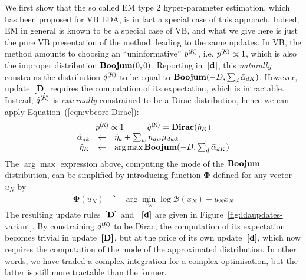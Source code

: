 We first show that the so called EM type 2 hyper-parameter estimation, which has been proposed for VB LDA, is in fact a special case of this approach. Indeed, EM in general is known to be a special case of VB, and what we give here is just the pure VB presentation of the method, leading to the same updates. In VB, the method amounts to choosing an ``uninformative'' ${p}^{(\!{K}\!)}$, i.e. ${p}^{(\!{K}\!)}\propto1$, which is also the improper distribution $\mathbf{Boojum}(0,0)$. Reporting in~$\textbf{[d]}$, this {\em naturally} constrains the distribution ${\dot{q}}^{(\!{K}\!)}$ to be equal to $\mathbf{Boojum}(-D,\sum_d\bar{\alpha}_{dK})$. However, update~$\textbf{[D]}$ requires the computation of its expectation, which is intractable. Instead, ${\dot{q}}^{(\!{K}\!)}$ is {\em externally} constrained to be a Dirac distribution, hence we can apply Equation~(\ref{eqn:vbcore-Dirac}):
\[
\begin{array}{rcl}
\multicolumn{3}{c}{
\begin{array}{c@{\hspace{1cm}}c}
\cpnt{p}{K}\propto1 &
\cpnt{\dot{q}}{K} = \mathbf{Dirac}(\vvmK_K)
\end{array}
}\\
\vvmDK_{dk} & \assignn & \vvmK_k+\sum_wn_{dw}\vvmDWK_{dwk} \\
\vvmK_K & \assignn & \arg\max\mbeta(-D,\sum_d\vvmbDK_{dK})
\end{array}
\]
The $\arg\max$ expression above, computing the mode of the $\mathbf{Boojum}$ distribution, can be simplified by introducing function $\boldsymbol{\Phi}$ defined for any vector $u_N$ by
\begin{eqnarray*}
\boldsymbol{\Phi}(u_N) & \triangleq & \arg\min_{x_N}\log\mathcal{B}(x_N)+u_Nx_N
\end{eqnarray*}
The resulting update rules~$\textbf{[D]}$ and ~$\textbf{[d]}$ are given in Figure~\ref{fig:ldaupdates-variant}. By constraining ${\dot{q}}^{(\!{K}\!)}$ to be Dirac, the computation of its expectation becomes trivial in update~$\textbf{[D]}$, but at the price of its own update~$\textbf{[d]}$, which now requires the computation of the mode of the approximated distribution. In other words, we have traded a complex integration for a complex optimisation, but the latter is still more tractable than the former.


